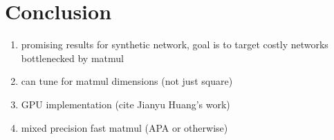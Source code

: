 \documentclass[conference]{IEEEtran}
\begin{document}
\section{Conclusion}

\begin{enumerate}
	\item promising results for synthetic network, goal is to target costly networks bottlenecked by matmul
	\item can tune for matmul dimensions (not just square)
	\item GPU implementation (cite Jianyu Huang's work)
	\item mixed precision fast matmul (APA or otherwise)
\end{enumerate}



\end{document}
